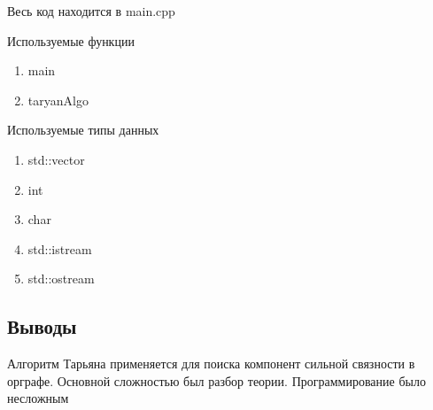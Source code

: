 \documentclass[12pt]{article}
\begin{document}
Весь код находится в main.cpp

Используемые функции
\begin{enumerate}
\item main
\item taryanAlgo
\end{enumerate}

Используемые типы данных
\begin{enumerate}
\item std::vector
\item int
\item char
\item std::istream
\item std::ostream
\end{enumerate}

\subsection*{Выводы}

Алгоритм Тарьяна применяется для поиска компонент сильной связности в орграфе. Основной сложностью был разбор теории. Программирование было несложным
\end{document}
